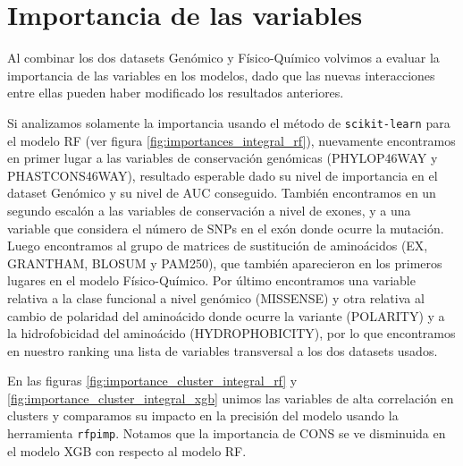 \section{Importancia de las variables}

Al combinar los dos datasets Genómico y Físico-Químico volvimos a evaluar la importancia de las variables en los modelos, dado que las nuevas interacciones entre ellas pueden haber modificado los resultados anteriores. 

Si analizamos solamente la importancia usando el método de \texttt{scikit-learn} para el modelo RF (ver figura \ref{fig:importances_integral_rf}), nuevamente encontramos en primer lugar a las variables de conservación genómicas (PHYLOP46WAY y PHASTCONS46WAY), resultado esperable dado su nivel de importancia en el dataset Genómico y su nivel de AUC conseguido. También encontramos en un segundo escalón a las variables de conservación a nivel de exones, y a una variable que considera el número de SNPs en el exón donde ocurre la mutación. Luego encontramos al grupo de matrices de sustitución de aminoácidos (EX, GRANTHAM, BLOSUM y PAM250), que también aparecieron en los primeros lugares en el modelo Físico-Químico. Por último encontramos una variable relativa a la clase funcional a nivel genómico (MISSENSE) y otra relativa al cambio de polaridad del aminoácido donde ocurre la variante (POLARITY) y a la hidrofobicidad del aminoácido (HYDROPHOBICITY), por lo que encontramos en nuestro ranking una lista de variables transversal a los dos datasets usados. 


En las figuras \ref{fig:importance_cluster_integral_rf} y \ref{fig:importance_cluster_integral_xgb} unimos las variables de alta correlación en clusters y comparamos su impacto en la precisión del modelo usando la herramienta \texttt{rfpimp}. Notamos que la importancia de CONS se ve disminuida en el modelo XGB con respecto al modelo RF.






